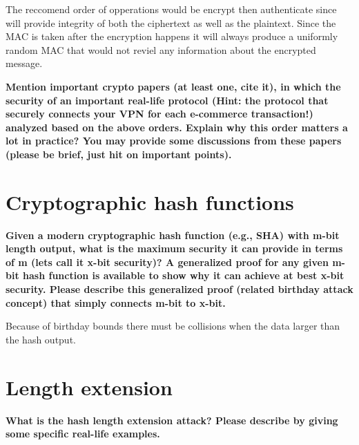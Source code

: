 \documentclass[letterpaper,11pt,notitlepage,fleqn]{article}
\begin{document}
The reccomend order of opperations would be encrypt then authenticate since will provide integrity of both the ciphertext as well as the plaintext. Since the MAC is taken after the encryption happens it will always produce a uniformly random MAC that would not reviel any information about the encrypted message. 

\noindent \textbf{Mention important crypto papers (at least one, cite it), in which the security of an important real-life  protocol  (Hint:  the  protocol  that  securely  connects  your  VPN  for  each  e-commerce transaction!)  analyzed  based  on  the  above  orders.  Explain  why  this  order  matters  a  lot  in practice?  You  may  provide  some  discussions  from  these  papers  (please  be  brief,  just  hit  on important points).}

\section{Cryptographic  hash  functions}
\noindent \textbf{Given  a modern  cryptographic  hash  function  (e.g.,  SHA) with m-bit  length  output, what is  the maximum  security  it  can  provide  in  terms  of  m  (lets  call  it  x-bit  security)? A  generalized proof  for  any  given  m-bit  hash  function  is  available  to  show  why  it  can  achieve  at  best  x-bit security.  Please  describe  this  generalized  proof  (related  birthday  attack  concept)  that  simply connects m-bit to x-bit.}

Because of birthday bounds there must be collisions when the data larger than the hash output. 

\section{Length extension}
\noindent \textbf{What  is  the  hash  length  extension  attack?  Please  describe  by  giving  some  specific  real-life examples.}
\end{document}
